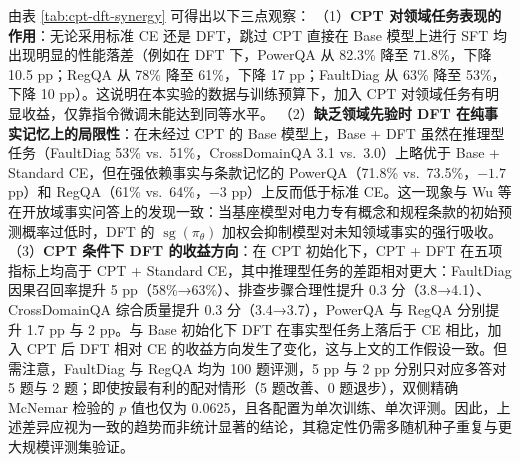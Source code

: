 \documentclass[fontset=fandol,type=master,campus=shenzhen,etitleauto=true]{hithesisbook}
\begin{document}
\begin{table}[htbp]
\centering
\caption{初始化基座（Base vs.\ CPT）与微调目标（Standard CE vs.\ DFT）的 $2 \times 2$ 对比结果}
\label{tab:cpt-dft-synergy}
\small
\setlength{\tabcolsep}{4pt}
\renewcommand{\arraystretch}{1.15}
\end{table}

由表 \ref{tab:cpt-dft-synergy} 可得出以下三点观察：
（1）\textbf{CPT 对领域任务表现的作用}：无论采用标准 CE 还是 DFT，跳过 CPT 直接在 Base 模型上进行 SFT 均出现明显的性能落差（例如在 DFT 下，PowerQA 从 82.3\% 降至 71.8\%，下降 10.5 pp；RegQA 从 78\% 降至 61\%，下降 17 pp；FaultDiag 从 63\% 降至 53\%，下降 10 pp）。这说明在本实验的数据与训练预算下，加入 CPT 对领域任务有明显收益，仅靠指令微调未能达到同等水平。
（2）\textbf{缺乏领域先验时 DFT 在纯事实记忆上的局限性}：在未经过 CPT 的 Base 模型上，Base + DFT 虽然在推理型任务（FaultDiag 53\% vs.\ 51\%，CrossDomainQA 3.1 vs.\ 3.0）上略优于 Base + Standard CE，但在强依赖事实与条款记忆的 PowerQA（71.8\% vs.\ 73.5\%，$-1.7$ pp）和 RegQA（61\% vs.\ 64\%，$-3$ pp）上反而低于标准 CE。这一现象与 Wu 等\cite{ref82}在开放域事实问答上的发现一致：当基座模型对电力专有概念和规程条款的初始预测概率过低时，DFT 的 $\operatorname{sg}(\pi_\theta)$ 加权会抑制模型对未知领域事实的强行吸收。
（3）\textbf{CPT 条件下 DFT 的收益方向}：在 CPT 初始化下，CPT + DFT 在五项指标上均高于 CPT + Standard CE，其中推理型任务的差距相对更大：FaultDiag 因果召回率提升 5 pp（58\%→63\%）、排查步骤合理性提升 0.3 分（3.8→4.1）、CrossDomainQA 综合质量提升 0.3 分（3.4→3.7），PowerQA 与 RegQA 分别提升 1.7 pp 与 2 pp。与 Base 初始化下 DFT 在事实型任务上落后于 CE 相比，加入 CPT 后 DFT 相对 CE 的收益方向发生了变化，这与上文的工作假设一致。但需注意，FaultDiag 与 RegQA 均为 100 题评测，5 pp 与 2 pp 分别只对应多答对 5 题与 2 题；即使按最有利的配对情形（5 题改善、0 题退步），双侧精确 McNemar 检验的 $p$ 值也仅为 0.0625，且各配置为单次训练、单次评测。因此，上述差异应视为一致的趋势而非统计显著的结论，其稳定性仍需多随机种子重复与更大规模评测集验证。
\end{document}
